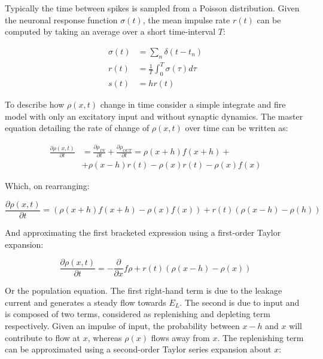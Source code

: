 		Typically the time between spikes is sampled from a Poisson distribution.
		Given the neuronal response function $\sigma(t)$, the mean impulse rate $r(t)$ can be computed by taking an average over a short time-interval $T$:

		\begin{equation}
			\begin{aligned}
				\sigma(t) &= \sum\limits_n\delta(t-t_n)\\
				r(t) &= \frac{1}{T}\int_0^T\sigma(\tau)d\tau\\
				s(t) &= hr(t)
			\end{aligned}
		\end{equation}

		To describe how $\rho(x,t)$ change in time consider a simple integrate and fire model with only an excitatory input and without synaptic dynamics.
		The master equation detailing the rate of change of $\rho(x,t)$ over time can be written as:

		\begin{equation}
			\begin{aligned}
				\frac{\partial\rho(x,t)}{\partial t} &= \frac{\partial\rho_{IN}}{\partial t} + \frac{\partial\rho_{OUT}}{\partial t} =\rho(x + h)f(x+h)+\\
																						 &+\rho(x-h)r(t)-\rho(x)r(t)-\rho(x)f(x)
			\end{aligned}
		\end{equation}

		Which, on rearranging:

		\begin{equation}
			\frac{\partial\rho(x,t)}{\partial t} = (\rho(x+h)f(x+h)-\rho(x)f(x))+r(t)(\rho(x-h)-\rho(h))
		\end{equation}

		And approximating the first bracketed expression using a first-order Taylor expansion:

		\begin{equation}
			\frac{\partial\rho(x,t)}{\partial t} = -\frac{\partial}{\partial x}f\rho + r(t)(\rho(x-h)-\rho(x))
			\label{eqs:population}
		\end{equation}

		Or the population equation.
		The first right-hand term is due to the leakage current and generates a steady flow towards $E_L$.
		The second is due to input and is composed of two terms, considered as replenishing and depleting term respectively.
		Given an impulse of input, the probability between $x-h$ and $x$ will contribute to flow at $x$, whereas $\rho(x)$ flows away from $x$.
		The replenishing term can be approximated using a second-order Taylor series expansion about $x$:

